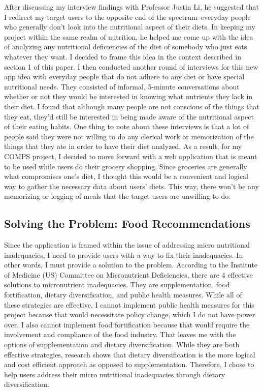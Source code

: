 \documentclass[10pt,twocolumn]{article}
\begin{document}
After discussing my interview findings with Professor Justin Li, he suggested that I redirect my target users to the opposite end of the spectrum–everyday people who generally don’t look into the nutritional aspect of their diets. In keeping my project within the same realm of nutrition, he helped me come up with the idea of analyzing any nutritional deficiencies of the diet of somebody who just eats whatever they want. I decided to frame this idea in the context described in section 1 of this paper. I then conducted another round of interviews for this new app idea with everyday people that do not adhere to any diet or have special nutritional needs. They consisted of informal, 5-minute conversations about whether or not they would be interested in knowing what nutrients they lack in their diet. I found that although many people are not conscious of the things that they eat, they’d still be interested in being made aware of the nutritional aspect of their eating habits. One thing to note about these interviews is that a lot of people said they were not willing to do any clerical work or memorization of the things that they ate in order to have their diet analyzed. As a result, for my COMPS project, I decided to move forward with a web application that is meant to be used while users do their grocery shopping. Since groceries are generally what compromises one’s diet, I thought this would be a convenient and logical way to gather the necessary data about users’ diets. This way, there won’t be any memorizing or logging of meals that the target users are unwilling to do. 

\subsection{Solving the Problem: Food Recommendations}
Since the application is framed within the issue of addressing micro nutritional inadequacies, I need to provide users with a way to fix their inadequacies. In other words, I must provide a solution to the problem. According to the Institute of Medicine (US) Committee on Micronutrient Deficiencies, there are 4 effective solutions to micronutrient inadequacies.\cite{howson_kennedy_horwitz_1998} They are supplementation, food fortification, dietary diversification, and public health measures. While all of these strategies are effective, I cannot implement public health measures for this project because that would necessitate policy change, which I do not have power over. I also cannot implement food fortification because that would require the involvement and compliance of the food industry. That leaves me with the options of supplementation and dietary diversification. While they are both effective strategies, research shows that dietary diversification is the more logical and cost efficient approach as opposed to supplementation.\cite{howson_kennedy_horwitz_1998} Therefore, I chose to help users address their micro nutritional inadequacies through dietary diversification. 
\end{document}
